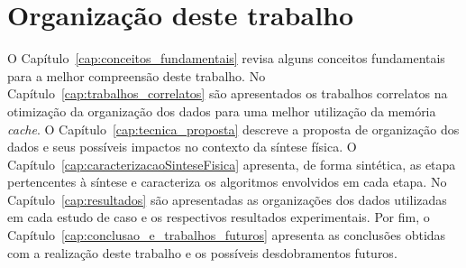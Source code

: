 %

\section{Organização deste trabalho}

O Capítulo~\ref{cap:conceitos_fundamentais} revisa alguns conceitos fundamentais para a melhor compreensão deste trabalho.
No Capítulo~\ref{cap:trabalhos_correlatos} são apresentados os trabalhos correlatos na otimização da organização dos dados para uma melhor utilização da memória \textit{cache}.
O Capítulo~\ref{cap:tecnica_proposta} descreve a proposta de organização dos dados e seus possíveis impactos no contexto da síntese física.
O Capítulo~\ref{cap:caracterizacaoSinteseFisica} apresenta, de forma sintética, as etapa pertencentes à síntese e caracteriza os algoritmos envolvidos em cada etapa.
No Capítulo~\ref{cap:resultados} são apresentadas as organizações dos dados utilizadas em cada estudo de caso e os respectivos resultados experimentais.
Por fim, o Capítulo~\ref{cap:conclusao_e_trabalhos_futuros} apresenta as conclusões obtidas com a realização deste trabalho e os possíveis desdobramentos futuros.

